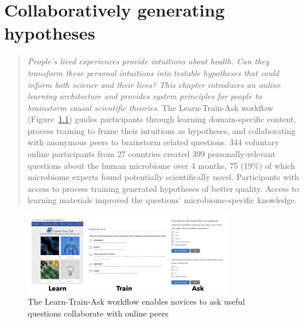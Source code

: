 \chapter{Collaboratively generating hypotheses}
\begin{quote}
\emph{People’s lived experiences provide intuitions about health.
Can they transform these personal intuitions into testable hypotheses
that could inform both science and their lives? This
chapter introduces an online learning architecture and provides
system principles for people to brainstorm causal scientific
theories}. The Learn-Train-Ask workflow (Figure~\ref{fig:docent-0}) 
guides participants through learning domain-specific content,
process training to frame their intuitions as hypotheses,
and collaborating with anonymous peers to brainstorm related
questions. 344 voluntary online participants from 27
countries created 399 personally-relevant questions about the
human microbiome over 4 months, 75 (19\%) of which microbiome
experts found potentially scientifically novel. Participants
with access to process training generated
hypotheses of better quality. Access to learning materials improved
the questions’ microbiome-specific knowledge.
\end{quote}

\begin{figure}[h] 
  \centering
  \includegraphics[width=0.8\textwidth]{figures/docent/fig-0.png}
  \caption[The Docent Learn-Train-Ask workflow]
{The Learn-Train-Ask workflow enables novices to ask useful questions collaborate with online peers}
  \label{fig:docent-0}
\end{figure}

\vspace{0.25in}


